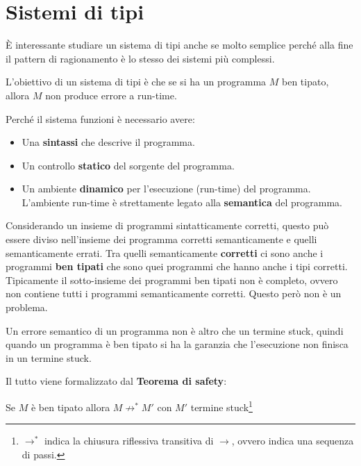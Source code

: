 


\section{Sistemi di tipi}

\`E interessante studiare un sistema di tipi anche se molto semplice perché alla fine il pattern di ragionamento è lo stesso dei sistemi più complessi.

L'obiettivo di un sistema di tipi è che se si ha un programma $M$ ben tipato, allora $M$ non produce errore a run-time.

Perché il sistema funzioni è necessario avere:

\begin{itemize}
	\item Una \textbf{sintassi} che descrive il programma.
	\item Un controllo \textbf{statico} del sorgente del programma.
	\item Un ambiente \textbf{dinamico} per l'esecuzione (run-time) del programma. L'ambiente run-time è strettamente legato alla \textbf{semantica} del programma.
\end{itemize}

Considerando un insieme di programmi sintatticamente corretti, questo può essere diviso nell'insieme dei programma corretti semanticamente e quelli semanticamente errati. Tra quelli semanticamente \textbf{corretti} ci sono anche i programmi \textbf{ben tipati} che sono quei programmi che hanno anche i tipi corretti. Tipicamente il sotto-insieme dei programmi ben tipati non è completo, ovvero non contiene tutti i programmi semanticamente corretti. Questo però non è un problema.

Un errore semantico di un programma non è altro che un termine stuck, quindi quando un programma è ben tipato si ha la garanzia che l'esecuzione non finisca in un termine stuck.

Il tutto viene formalizzato dal \textbf{Teorema di safety}:

\begin{center}
	Se $M$ è ben tipato allora $M \not\rightarrow^* M'$ con $M'$ termine stuck\footnote{$\rightarrow^*$ indica la chiusura riflessiva transitiva di $\rightarrow$, ovvero indica una sequenza di passi.}
\end{center}

